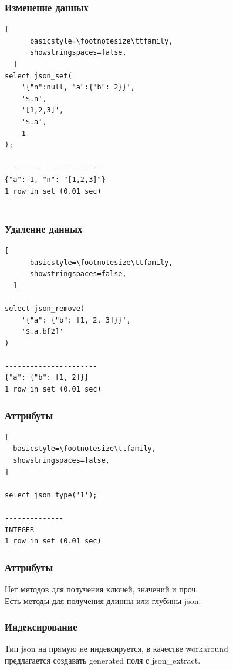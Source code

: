 \documentclass[14pt, compress, aspectratio=169]{beamer}
\begin{document}
\begin{frame}[fragile]
  \frametitle{Изменение данных}

  \begin{lstlisting}[
      basicstyle=\footnotesize\ttfamily,
      showstringspaces=false,
  ]
select json_set(
    '{"n":null, "a":{"b": 2}}',
    '$.n',
    '[1,2,3]',
    '$.a',
    1
);

--------------------------
{"a": 1, "n": "[1,2,3]"}
1 row in set (0.01 sec)
 
  \end{lstlisting}

\end{frame}

\begin{frame}[fragile]
  \frametitle{Удаление данных}

  \begin{lstlisting}[
      basicstyle=\footnotesize\ttfamily,
      showstringspaces=false,
  ]

select json_remove(
    '{"a": {"b": [1, 2, 3]}}',
    '$.a.b[2]'
)

----------------------
{"a": {"b": [1, 2]}}
1 row in set (0.01 sec)

  \end{lstlisting}
\end{frame}

\begin{frame}[fragile]
  \frametitle{Аттрибуты}

\begin{lstlisting}[
  basicstyle=\footnotesize\ttfamily,
  showstringspaces=false,
]

select json_type('1');

--------------
INTEGER
1 row in set (0.01 sec)

\end{lstlisting}

\end{frame}

\begin{frame}[fragile]
  \frametitle{Аттрибуты}
  Нет методов для получения ключей, значений и проч.\\
  Есть методы для получения длинны или глубины json.

\end{frame}

\begin{frame}[fragile]
  \frametitle{Индексирование}
  Тип json на прямую не индексируется, в качестве workaround\\
  предлагается создавать generated поля с json\_extract.
\end{frame}
\end{document}
